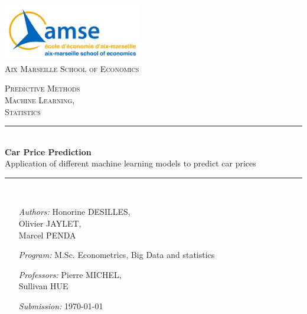 \documentclass[12pt]{article}
\begin{document}
\newcommand{\HRule}{\rule{\linewidth}{0.5mm}} 

\thispagestyle{empty}

\begin{center}

\includegraphics[width=0.45\textwidth]{amse_logo.png}\\
\vspace{0.5cm}
\textsc{\huge Aix Marseille School of Economics} \\[0.3cm]

\vspace{2cm}


\textsc{\large Predictive Methods}\\[0.1cm]
\textsc{\large Machine Learning,} \\[0.1cm]
\textsc{\large Statistics}


\vspace{1cm}


\HRule \\[0.4cm]
{ \huge \textbf{Car Price Prediction} \\[0.5cm] 
Application of different machine learning models to predict car prices
}\\[0.4cm]
\HRule \\[3cm]


\begin{minipage}[t]{0.8\textwidth}
	\begin{itemize}
    \item[\emph{Authors:}] Honorine DESILLES, \\
    Olivier JAYLET, \\
    Marcel PENDA 
    \item[\emph{Program:}] M.Sc. Econometrics, Big Data and statistics
	\item[\emph{Professors:}] Pierre MICHEL, \\ Sullivan HUE
	\item[\emph{Submission:}] \today
	\end{itemize}
\end{minipage}




\end{center}
\newpage

\renewcommand{\contentsname}{Table of contents}\tableofcontents
\end{document}

